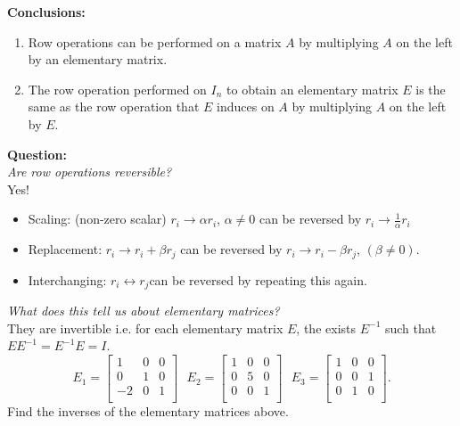 \documentclass{report}
\begin{document}
\textbf{Conclusions:}\\
\begin{enumerate}[label=(\roman*)]
  \item Row operations can be performed on a matrix $A$ by multiplying $ A$ on the left by an elementary matrix.
  \item The row operation performed on $I_n$ to obtain an elementary matrix  $E$ is the same as the row operation that $E$ induces on $A$ by multiplying $A$  on the left by $E$.\\
  \end{enumerate}
  \textbf{Question:}\\
  \textit{Are row operations reversible?}\\
  Yes!\\
  \begin{itemize}
          \item Scaling: (non-zero scalar) 
                  $r_i \to \alpha r_i $,  $\alpha \neq 0 $ can be reversed by $r_i \to \frac{1}{\alpha }r_i$
          \item Replacement: $r_i \to r_i + \beta r_j$ can be reversed by  $r_i \to r_i - \beta r_j$, $\left( \beta \neq 0 \right) $.
          \item Interchanging: $r_i \leftrightarrow r_j$can be reversed by repeating this again. 
  \end{itemize}
  \textit{What does this tell us about elementary matrices?} \\
  They are invertible i.e.  for each elementary matrix $E$, the exists $E^{-1}$ such that $E E^{-1}= E^{-1}E=I$.
\[
E_1 = \begin{bmatrix}
1 & 0 & 0\\
0 & 1 & 0\\
-2 & 0 & 1\\
\end{bmatrix} \text{ } E_2 = \begin{bmatrix}
1 & 0 & 0\\
0 & 5 & 0\\
0 & 0 & 1\\
\end{bmatrix} \text{ } E_3 = \begin{bmatrix}
1 & 0 & 0\\
0 & 0 & 1\\
0 & 1 & 0\\
\end{bmatrix}
.\] Find the inverses of the elementary matrices above.\\
\end{document}
